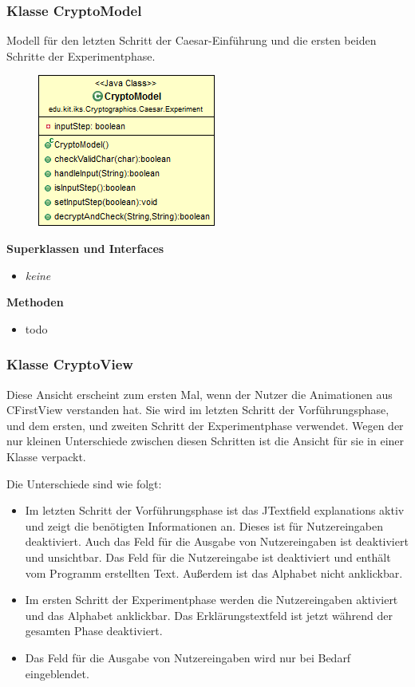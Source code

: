 \documentclass{article}
\begin{document}
\subsubsection{Klasse CryptoModel}
      Modell für den letzten Schritt der Caesar-Einführung und die ersten beiden Schritte der Experimentphase.

      \begin{figure}[H]
        \centering
        \includegraphics{resources/edu-kit-iks-Cryptographics-Caesar-Experiment-CryptoModel}
      \end{figure}

      \textbf{Superklassen und Interfaces}
      \begin{itemize}
        \item \textit{keine}
      \end{itemize}

      \textbf{Methoden}
      \begin{itemize}
        \item todo
      \end{itemize}

\subsubsection{Klasse CryptoView}
      Diese Ansicht erscheint zum ersten Mal, wenn der Nutzer die Animationen aus CFirstView verstanden hat. Sie wird im letzten Schritt der Vorführungsphase, und dem ersten, und zweiten Schritt der Experimentphase verwendet. Wegen der nur kleinen Unterschiede zwischen diesen Schritten ist die Ansicht für sie in einer Klasse verpackt.
      
      Die Unterschiede sind wie folgt: 
      \begin{itemize}
      	\item Im letzten Schritt der Vorführungsphase ist das JTextfield explanations aktiv und zeigt die benötigten Informationen an. Dieses ist für Nutzereingaben deaktiviert. Auch das Feld für die Ausgabe von Nutzereingaben ist deaktiviert und unsichtbar. Das Feld für die Nutzereingabe ist deaktiviert und enthält vom Programm erstellten Text. Außerdem ist das Alphabet nicht anklickbar.
      	\item Im ersten Schritt der Experimentphase werden die Nutzereingaben aktiviert und das Alphabet anklickbar. Das Erklärungstextfeld ist jetzt während der gesamten Phase deaktiviert.
      	\item Das Feld für die Ausgabe von Nutzereingaben wird nur bei Bedarf eingeblendet.
      \end{itemize} 
      
\end{document}

